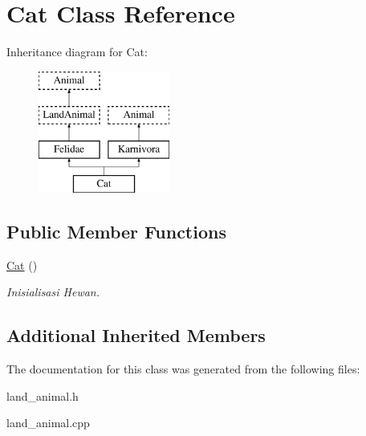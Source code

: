 \hypertarget{class_cat}{}\section{Cat Class Reference}
\label{class_cat}
Inheritance diagram for Cat\+:\begin{figure}[H]
\begin{center}
\leavevmode
\includegraphics[height=4.000000cm]{class_cat}
\end{center}
\end{figure}
\subsection*{Public Member Functions}
\begin{DoxyCompactItemize}
\item 
\hyperlink{class_cat_adff0d67c4d14c4eeeb35b8daa33ee442}{Cat} ()\hypertarget{class_cat_adff0d67c4d14c4eeeb35b8daa33ee442}{}\label{class_cat_adff0d67c4d14c4eeeb35b8daa33ee442}

\begin{DoxyCompactList}\small\item\em Inisialisasi Hewan. \end{DoxyCompactList}\end{DoxyCompactItemize}
\subsection*{Additional Inherited Members}


The documentation for this class was generated from the following files\+:\begin{DoxyCompactItemize}
\item 
land\+\_\+animal.\+h\item 
land\+\_\+animal.\+cpp\end{DoxyCompactItemize}
